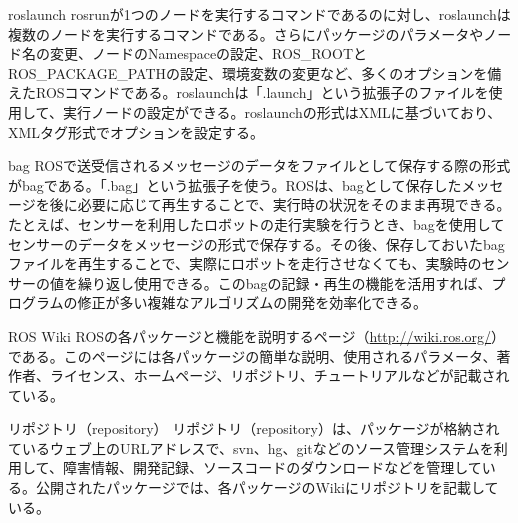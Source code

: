 
\begin{term}{roslaunch}
rosrunが1つのノードを実行するコマンドであるのに対し、roslaunchは複数のノードを実行するコマンドである。さらにパッケージのパラメータやノード名の変更、ノードのNamespaceの設定、ROS\_ROOTとROS\_PACKAGE\_PATHの設定、環境変数の変更など、多くのオプションを備えたROSコマンドである。roslaunchは「.launch」という拡張子のファイルを使用して、実行ノードの設定ができる。roslaunchの形式はXMLに基づいており、XMLタグ形式でオプションを設定する。
\end{term}


\begin{term}{bag}
ROSで送受信されるメッセージのデータをファイルとして保存する際の形式がbagである。「.bag」という拡張子を使う。ROSは、bagとして保存したメッセージを後に必要に応じて再生することで、実行時の状況をそのまま再現できる。たとえば、センサーを利用したロボットの走行実験を行うとき、bagを使用してセンサーのデータをメッセージの形式で保存する。その後、保存しておいたbagファイルを再生することで、実際にロボットを走行させなくても、実験時のセンサーの値を繰り返し使用できる。このbagの記録・再生の機能を活用すれば、プログラムの修正が多い複雑なアルゴリズムの開発を効率化できる。
\end{term}


\begin{term}{ROS Wiki}
ROSの各パッケージと機能を説明するページ（\url{http://wiki.ros.org/}）である。このページには各パッケージの簡単な説明、使用されるパラメータ、著作者、ライセンス、ホームページ、リポジトリ、チュートリアルなどが記載されている。
\end{term}


\begin{term}{リポジトリ（repository）}
リポジトリ（repository）は、パッケージが格納されているウェブ上のURLアドレスで、svn、hg、gitなどのソース管理システムを利用して、障害情報、開発記録、ソースコードのダウンロードなどを管理している。公開されたパッケージでは、各パッケージのWikiにリポジトリを記載している。
\end{term}

